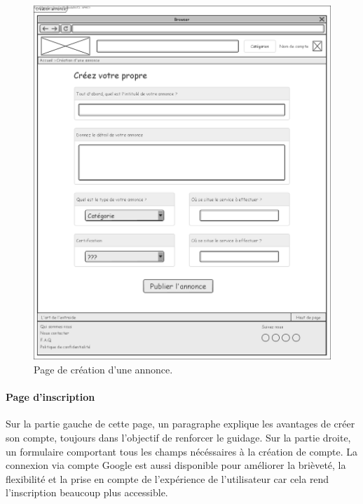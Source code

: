\documentclass[a4paper,11pt]{article}
\begin{document}
\begin{figure}[H]
  \includegraphics[width=\linewidth]{images/maquette-creation-annonce.png}
  \caption{Page de création d'une annonce.}
  \label{fig:maquette-creation-annonce}
\end{figure}
\newpage

\paragraph{Page d'inscription}

Sur la partie gauche de cette page, un paragraphe explique les avantages de créer son compte,
toujours dans l'objectif de renforcer le guidage. Sur la partie droite, un formulaire comportant
tous les champs nécéssaires à la création de compte. La connexion via compte Google est aussi
disponible pour améliorer la brièveté, la flexibilité et la prise en compte de l'expérience de
l'utilisateur car cela rend l'inscription beaucoup plus accessible.
\end{document}
